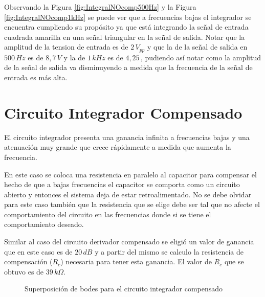 \documentclass[11pt, a4paper]{article}
\begin{document}
Observando la Figura \ref{fig:IntegralNOcomp500Hz} y la Figura \ref{fig:IntegralNOcomp1kHz} se puede ver que a frecuencias bajas el integrador se encuentra cumpliendo su propósito ya que está integrando la señal de entrada cuadrada amarilla en una señal triangular en la señal de salida. Notar que la amplitud de la tension de entrada es de $2 \, V_{pp}$ y que la de la señal de salida en $500 \,Hz$ es de $8,7 \,V$ y la de $1 \,kHz$ es de $4,25 \,$, pudiendo así notar como la amplitud de la señal de salida va disminuyendo a medida que la frecuencia de la señal de entrada es más alta.






\section{Circuito Integrador Compensado}
El circuito integrador presenta una ganancia infinita a frecuencias bajas y una atenuación muy grande que crece rápidamente a medida que aumenta la frecuencia.

En este caso se coloca una resistencia en paralelo al capacitor para compensar el hecho de que a bajas frecuencias el capacitor se comporta como un circuito abierto y entonces el sistema deja de estar retroalimentado. No se debe olvidar para este caso también que la resistencia que se elige debe ser tal que no afecte el comportamiento del circuito en las frecuencias donde si se tiene el comportamiento deseado.

Similar al caso del circuito derivador compensado se eligió un valor de ganancia que en este caso es de $20 \, dB$ y a partir del mismo se calculo la resistencia de compensación ($R_c$) necesaria para tener esta ganancia. El valor de $R_c$ que se obtuvo es de $39 \,k \Omega$.

\begin{figure}[H]
	\begin{center}
		\caption{Superposición de bodes para el circuito integrador compensado}
		\label{fig:superposicion3casosintegradorCOMPENSADO}
	\end{center}
\end{figure}
\end{document}
